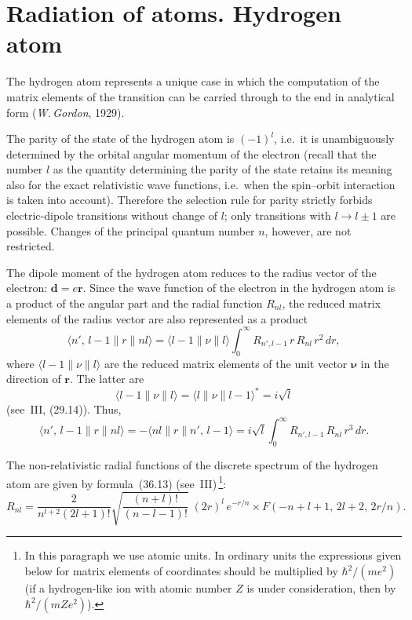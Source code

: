 \section{Radiation of atoms. Hydrogen atom}

The hydrogen atom represents a unique case in which the computation of the matrix elements of the transition can be carried through to the end in analytical form (\textit{W.\,Gordon}, 1929).

The parity of the state of the hydrogen atom is $(-1)^l$, i.e.\ it is unambiguously determined by the orbital angular momentum of the electron (recall that the number $l$ as the quantity determining the parity of the state retains its meaning also for the exact relativistic wave functions, i.e.\ when the spin--orbit interaction is taken into account). Therefore the selection rule for parity strictly forbids electric-dipole transitions without change of $l$; only transitions with $l \to l \pm 1$ are possible. Changes of the principal quantum number $n$, however, are not restricted.

The dipole moment of the hydrogen atom reduces to the radius vector of the electron: $\mathbf{d} = e\mathbf{r}$. Since the wave function of the electron in the hydrogen atom is a product of the angular part and the radial function $R_{nl}$, the reduced matrix elements of the radius vector are also represented as a product
\begin{equation}
\langle n',\,l-1\|r\|nl\rangle = \langle l-1\|\nu\|l\rangle\int_0^\infty R_{n',l-1}\,r\,R_{nl}\,r^2\,dr,
\tag{52.1}
\end{equation}
where $\langle l-1\|\nu\|l\rangle$ are the reduced matrix elements of the unit vector $\boldsymbol{\nu}$ in the direction of $\mathbf{r}$. The latter are
\[
\langle l-1\|\nu\|l\rangle = \langle l\|\nu\|l-1\rangle^* = i\sqrt{l}
\]
(see~III, (29.14)). Thus,
\begin{equation}
\langle n',\,l-1\|r\|nl\rangle = -\langle nl\|r\|n',\,l-1\rangle = i\sqrt{l}\int_0^\infty R_{n',l-1}\,R_{nl}\,r^3\,dr.
\tag{52.1}
\end{equation}

The non-relativistic radial functions of the discrete spectrum of the hydrogen atom are given by formula~(36.13) (see~III)\,\footnote{In this paragraph we use atomic units. In ordinary units the expressions given below for matrix elements of coordinates should be multiplied by $\hbar^2/(me^2)$ (if a hydrogen-like ion with atomic number $Z$ is under consideration, then by $\hbar^2/(mZe^2)$).}:
\begin{equation}
R_{nl} = \frac{2}{n^{l+2}(2l+1)!}\sqrt{\frac{(n+l)!}{(n-l-1)!}}\;(2r)^l\,e^{-r/n}\times F(-n+l+1,\,2l+2,\,2r/n).
\tag{52.2}
\end{equation}

